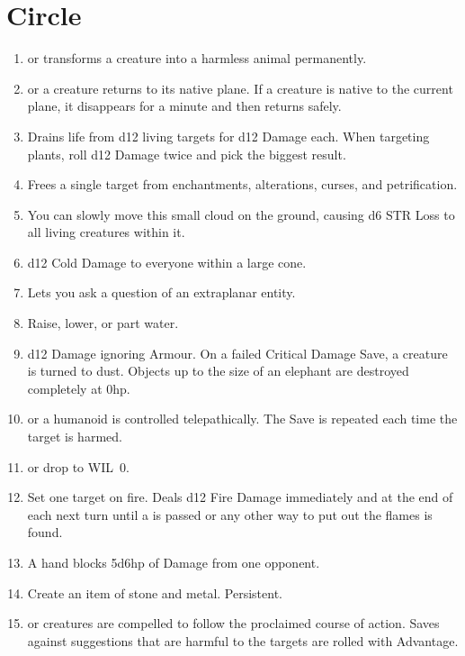 \documentclass[itdr]{subfiles}
\begin{document}
\vfill
\break

\section{ Circle}
\def \spellcircle {5}
\begin{enumerate}
	\item {}  or transforms a creature into a harmless animal permanently.
	\item {}  or a creature returns to its native plane. If a creature is native to the current plane, it disappears for a minute and then returns safely.
	\item {} Drains life from d12 living targets for d12 Damage each. When targeting plants, roll d12 Damage twice and pick the biggest result.
	\item {} Frees a single target from enchantments, alterations, curses, and \mbox{petrification}.
	\item {} You can slowly move this small cloud on the ground, causing d6 STR Loss to all living creatures within it.
	\item {} d12 Cold Damage to everyone within a large cone.
	\item {} Lets you ask a question of an extraplanar entity.
	\item {} Raise, lower, or part water.
	\item {} d12 Damage ignoring Armour. On a failed Critical Damage Save, a creature is turned to dust. Objects up to the size of an elephant are destroyed completely at 0hp.
	\item {}  or a humanoid is controlled telepathically. The Save is repeated each time the target is harmed.
	\item {}  or drop to WIL~0.
	\item {} Set one target on fire. Deals d12 Fire Damage immediately and at the end of each next turn until a  is passed or any other way to put out the flames is found.
	\item {} A hand blocks 5d6hp of Damage from one opponent.
	\item {} Create an item of stone and metal. Persistent.
	\item {}  or creatures are compelled to follow the proclaimed course of action. Saves against suggestions that are harmful to the targets are rolled with Advantage.

\end{enumerate}
\end{document}
